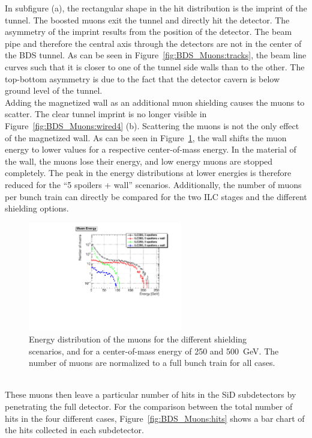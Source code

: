In subfigure (a), the rectangular shape in the hit distribution is the imprint of the tunnel.
The boosted muons exit the tunnel and directly hit the detector.
The asymmetry of the imprint results from the position of the detector.
The beam pipe and therefore the central axis through the detectors are not in the center of the BDS tunnel.
As can be seen in Figure~\ref{fig:BDS_Muons:tracks}, the beam line curves such that it is closer to one of the tunnel side walls than to the other.
The top-bottom asymmetry is due to the fact that the detector cavern is below ground level of the tunnel.
\\Adding the magnetized wall as an additional muon shielding causes the muons to scatter.
The clear tunnel imprint is no longer visible in Figure~\ref{fig:BDS_Muons:wired4} (b).
Scattering the muons is not the only effect of the magnetized wall.
As can be seen in Figure~\ref{fig:BDS_Muons:energy}, the wall shifts the muon energy to lower values for a respective center-of-mass energy.
In the material of the wall, the muons lose their energy, and low energy muons are stopped completely. %
The peak in the energy distributions at lower energies is therefore reduced for the ``5 spoilers + wall'' scenarios.
Additionally, the number of muons per bunch train can directly be compared for the two ILC stages and the different shielding options.
\begin{figure}[htbp]
\centering
\includegraphics[width=0.6\textwidth]{Figures/BDS_muons/Energy_Comparison_ILC500vsILC250.pdf}
\caption[Muon energy]{Energy distribution of the muons for the different shielding scenarios, and for a center-of-mass energy of 250 and \SI{500}{\GeV}.
The number of muons are normalized to a full bunch train for all cases.}
\label{fig:BDS_Muons:energy}
\end{figure}
\\These muons then leave a particular number of hits in the SiD subdetectors by penetrating the full detector.
For the comparison between the total number of hits in the four different cases, Figure~\ref{fig:BDS_Muons:hits} shows a bar chart of the hits collected in each subdetector.

